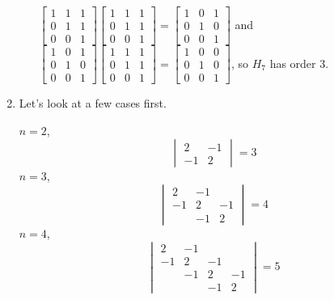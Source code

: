 \documentclass[12pt,letterpaper]{article}
\begin{document}
\begin{enumerate}
\begin{enumerate}
          $
            \begin{bmatrix}
              1 & 1 & 1 \\
              0 & 1 & 1 \\
              0 & 0 & 1
            \end{bmatrix}
            \begin{bmatrix}
              1 & 1 & 1 \\
              0 & 1 & 1 \\
              0 & 0 & 1
            \end{bmatrix}
            =
            \begin{bmatrix}
              1 & 0 & 1 \\
              0 & 1 & 0 \\
              0 & 0 & 1
            \end{bmatrix}
          $ and
          $
            \begin{bmatrix}
              1 & 0 & 1 \\
              0 & 1 & 0 \\
              0 & 0 & 1
            \end{bmatrix}
            \begin{bmatrix}
              1 & 1 & 1 \\
              0 & 1 & 1 \\
              0 & 0 & 1
            \end{bmatrix}
            =
            \begin{bmatrix}
              1 & 0 & 0 \\
              0 & 1 & 0 \\
              0 & 0 & 1
            \end{bmatrix}
          $, so $H_7$ has order 3.
      \end{enumerate}

    \item
      Let's look at a few cases first.

      $n = 2$,
      \[
        \begin{vmatrix}
          2 & -1 \\
          -1 & 2
        \end{vmatrix}
        = 3
      \]
      $n = 3$,
      \[
        \begin{vmatrix}
          2  & -1 &    \\
          -1 & 2  & -1 \\
             & -1 & 2
        \end{vmatrix}
        = 4
      \]
      $n = 4$,
      \[
        \begin{vmatrix}
          2  & -1 &    &    \\
          -1 & 2  & -1 &    \\
             & -1 & 2  & -1 \\
             &    & -1 & 2
        \end{vmatrix}
        = 5
      \]


\end{enumerate}
\end{document}
